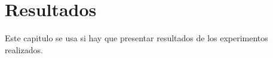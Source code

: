 \chapter{Resultados}

Este capitulo se usa si hay que presentar resultados de los experimentos realizados.

